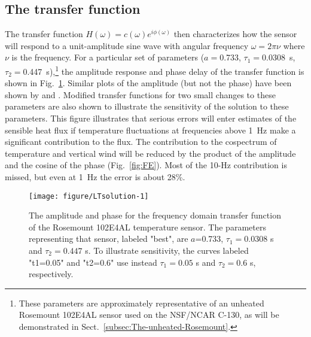 \documentclass[11pt,twoside,american,12pt,twoside,american]{article}\usepackage[]{graphicx}\usepackage[]{color}
\makeatletter
\def\maxwidth{ %
  \ifdim\Gin@nat@width>\linewidth
    \linewidth
  \else
    \Gin@nat@width
  \fi
}
\newenvironment{knitrout}{}{} %
\makeatother
\begin{document}
\subsection{The transfer function\label{subsec:The-resulting-transfer}}

The transfer function $H(\omega)=c(\omega)e^{i\phi(\omega)}$ then
characterizes how the sensor will respond to a unit-amplitude sine
wave with angular frequency $\omega=2\pi\nu$ where $\nu$ is the
frequency. For a particular set of parameters ($a=$0.733,
$\tau_{1}=$0.0308~s, $\tau_{2}=$0.447~s),\footnote{These parameters are approximately representative of an unheated Rosemount
102E4AL sensor used on the NSF/NCAR C-130, as will be demonstrated
in Sect.~\eqref{subsec:The-unheated-Rosemount}.} the amplitude response and phase delay of the transfer function is
shown in Fig.~\ref{fig:LTsolution}. Similar plots of the amplitude
(but not the phase) have been shown by \citet{mccarthy1973method}
and \citet{nicholls1978measurements}. Modified transfer functions
for two small changes to these parameters are also shown to illustrate
the sensitivity of the solution to these parameters. This figure illustrates
that serious errors will enter estimates of the sensible heat flux
if temperature fluctuations at frequencies above 1~Hz make a significant
contribution to the flux. The contribution to the cospectrum of temperature
and vertical wind will be reduced by the product of the amplitude
and the cosine of the phase (Fig.~\ref{fig:FE}). Most of the 10-Hz
contribution is missed, but even at 1~Hz the error is about 28\%.

\begin{knitrout}
\color{fgcolor}\begin{figure}

{\centering \texttt{[image: figure/LTsolution-1]} 

}

\caption[The amplitude and phase for the frequency domain transfer function of the Rosemount 102E4AL temperature sensor]{The amplitude and phase for the frequency domain transfer function of the Rosemount 102E4AL temperature sensor. The parameters representing that sensor, labeled "best", are $a$=0.733, $\tau_1=0.0308$ s and $\tau_2=0.447$ s. To illustrate sensitivity,  the curves labeled "t1=0.05" and "t2=0.6" use instead $\tau_1=0.05$ s and $\tau_2=0.6$ s, respectively.}\label{fig:LTsolution}
\end{figure}


\end{knitrout}
\end{document}
